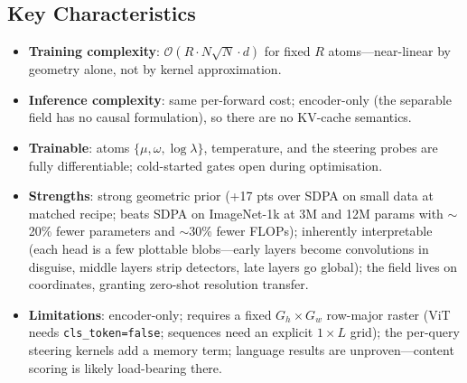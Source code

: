 \subsection{Key Characteristics}
\begin{itemize}[leftmargin=*]
    \item \textbf{Training complexity}: $\mathcal{O}(R \cdot N \sqrt{N} \cdot d)$ for fixed $R$ atoms---near-linear by geometry alone, not by kernel approximation.
    \item \textbf{Inference complexity}: same per-forward cost; encoder-only (the separable field has no causal formulation), so there are no KV-cache semantics.
    \item \textbf{Trainable}: atoms $\{\mu, \omega, \log\lambda\}$, temperature, and the steering probes are fully differentiable; cold-started gates open during optimisation.
    \item \textbf{Strengths}: strong geometric prior (+17 pts over SDPA on small data at matched recipe; beats SDPA on ImageNet-1k at 3M and 12M params with $\sim$20\% fewer parameters and $\sim$30\% fewer FLOPs); inherently interpretable (each head is a few plottable blobs---early layers become convolutions in disguise, middle layers strip detectors, late layers go global); the field lives on coordinates, granting zero-shot resolution transfer.
    \item \textbf{Limitations}: encoder-only; requires a fixed $G_h \times G_w$ row-major raster (ViT needs \texttt{cls\_token=false}; sequences need an explicit $1 \times L$ grid); the per-query steering kernels add a memory term; language results are unproven---content scoring is likely load-bearing there.
\end{itemize}
